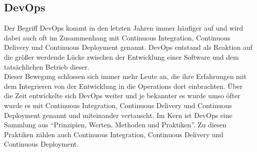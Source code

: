 \subsection{DevOps}
Der Begriff DevOps kommt in den letzten Jahren immer häufiger auf\autocite{Sauce.2018} und wird dabei auch oft im Zusammenhang mit Continuous Integration, Continuous Delivery und Continuous Deployment genannt. DevOps entstand als Reaktion auf die größer werdende Lücke zwischen der Entwicklung einer Software und dem tatsächlichen Betrieb dieser.\autocite[Vgl.][S.22]{Stahl.2018}\\ Dieser Bewegung schlossen sich immer mehr Leute an, die ihre Erfahrungen mit dem Integrieren von der Entwicklung in die Operations dort einbrachten. Über die Zeit entwickelte sich DevOps weiter und je bekannter es wurde umso öfter wurde es mit Continuous Integration, Continuous Delivery und Continuous Deployment genannt und miteinander vertauscht.\autocite[Vgl.][S.23]{Stahl.2018} Im Kern ist DevOps eine Sammlung aus \enquote{Prinzipien, Werten, Methoden und Praktiken}\autocite[S.23]{Stahl.2018}. Zu diesen Praktiken zählen auch Continuous Integration, Continuous Delivery und Continuous Deployment. 
